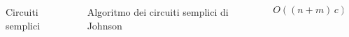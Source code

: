 \begin{minipage}[t]{\textwidth}
    \begin{columns}
        \begin{column}{0.25\textwidth}
        \centering
        Circuiti semplici
        \end{column}
    \hfill
        \begin{column}{0.25\textwidth}
        \centering
        Algoritmo dei circuiti semplici di Johnson
        \end{column}
    \hfill
        \begin{column}{0.25\textwidth}
        \centering
        $O((n+m) \, c)$
        \end{column}
    \hfill
        \begin{column}{0.25\textwidth}
        \centering
        \resizebox{0.65\textwidth}{!}{}
        \end{column}
    \end{columns}
\end{minipage}